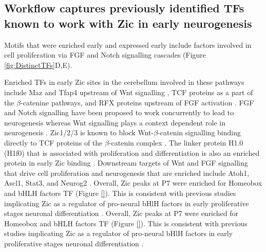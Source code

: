 \documentclass[fleqn,10pt,twocolumn]{wlscirep}
\begin{document}
\subsection*{Workflow captures previously identified TFs known to work with Zic in early neurogenesis}



Motifs that were enriched early and expressed early include factors involved in cell proliferation via FGF and Notch signalling cascades (Figure \ref{fig:DistinctTFs}D,E). 

Enriched TFs in early Zic sites in the cerebellum involved in these pathways include  Maz and Tfap4 upstream of Wnt signalling \cite{Martinez2020TheDevelopment, Song2018TranscriptionCarcinoma}, TCF proteins as a part of the $\beta$-catenine pathways, and RFX proteins upstream of FGF activation \cite{Hsu2010RegulationRFX1}. FGF and Notch signalling have been proposed to work concurrently to lead to neurogenesis \cite{Voelkel2014FGFHierarchy} whereas Wnt signalling plays a context dependent role in neurogenesis \cite{Lassiter2014SignalingDelamination}. Zic1/2/3 is known to block Wnt-$\beta$-catenin signalling binding directly to TCF proteins of the $\beta$-catenin complex \cite{Ge2020Zic1Transition, Fujimi2012XenopusPathway, Murgan2015AtypicalPrecursors, Pourebrahim2011TranscriptionSignaling, Aruga2018ZicDisease,Aruga2018Zic1,Lowenstein2021Olig3Development}. The linker protein H1.0 (H1f0) that is associated with proliferation and differentiation is also an enriched protein in early Zic binding \cite{DiLiegro2018H1.0Differentiation}. Downstream targets of Wnt and FGF signalling that drive cell proliferation and neurogenesis that are enriched include Atoh1, Ascl1, Stat3, and Neurog2 \cite{Dennis2019BHLHReprogramming}. Overall, Zic peaks at P7 were enriched for Homeobox and bHLH factors TF (Figure \ref{}). This is consistent with previous studies implicating Zic as a regulator of pro-neural bHlH factors in early proliferative stages neuronal differentiation \cite{Aruga2018ZicDisease}. Overall, Zic peaks at P7 were enriched for Homeobox and bHLH factors TF (Figure \ref{}). This is consistent with previous studies implicating Zic as a regulator of pro-neural bHlH factors in early proliferative stages neuronal differentiation \cite{Aruga2018ZicDisease}. 
\end{document}
